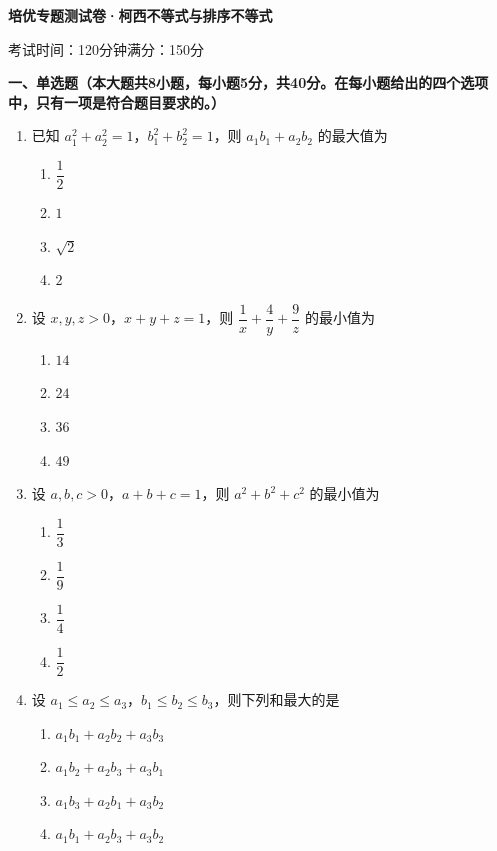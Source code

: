 \documentclass[12pt, a4paper]{ctexart}
\newcommand{\score}[1]{\hfill\makebox[2cm][l]{(#1分)}}
\begin{document}
\begin{center}
\Large\textbf{培优专题测试卷·柯西不等式与排序不等式}

\normalsize
考试时间：120分钟\quad 满分：150分
\end{center}

\vspace{0.5cm}

\noindent\textbf{一、单选题（本大题共8小题，每小题5分，共40分。在每小题给出的四个选项中，只有一项是符合题目要求的。）}

\vspace{0.3cm}

\begin{enumerate}
\item 已知 $a_1^2 + a_2^2 = 1$，$b_1^2 + b_2^2 = 1$，则 $a_1 b_1 + a_2 b_2$ 的最大值为\score{5}
\begin{enumerate}[label=\Alph*.]
\item $\dfrac{1}{2}$
\item $1$
\item $\sqrt{2}$
\item $2$
\end{enumerate}

\item 设 $x, y, z > 0$，$x + y + z = 1$，则 $\dfrac{1}{x} + \dfrac{4}{y} + \dfrac{9}{z}$ 的最小值为\score{5}
\begin{enumerate}[label=\Alph*.]
\item $14$
\item $24$
\item $36$
\item $49$
\end{enumerate}

\item 设 $a, b, c > 0$，$a + b + c = 1$，则 $a^2 + b^2 + c^2$ 的最小值为\score{5}
\begin{enumerate}[label=\Alph*.]
\item $\dfrac{1}{3}$
\item $\dfrac{1}{9}$
\item $\dfrac{1}{4}$
\item $\dfrac{1}{2}$
\end{enumerate}

\item 设 $a_1 \leqslant a_2 \leqslant a_3$，$b_1 \leqslant b_2 \leqslant b_3$，则下列和最大的是\score{5}
\begin{enumerate}[label=\Alph*.]
\item $a_1 b_1 + a_2 b_2 + a_3 b_3$
\item $a_1 b_2 + a_2 b_3 + a_3 b_1$
\item $a_1 b_3 + a_2 b_1 + a_3 b_2$
\item $a_1 b_1 + a_2 b_3 + a_3 b_2$
\end{enumerate}


\end{enumerate}
\end{document}
